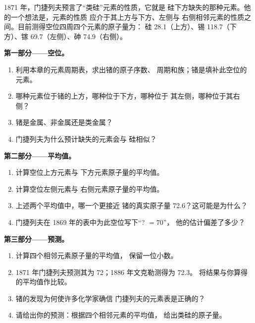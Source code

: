 \begin{problem}
\label{pb:g9:periodic-table-first-look:1}
1871 年，门捷列夫预言了“类硅”元素的性质，它就是
硅下方缺失的那种元素。他的一个想法是，元素的性质
应介于其上方与下方、左侧与
右侧相邻元素的性质之间。目前测得空位四周四个元素的原子量为：
硅 28.1（上方）、锡 118.7（下方）、镓 69.7（左侧）、砷
74.9（右侧）。

\medskip
\noindent\textbf{第一部分——空位。}
\begin{enumerate}
  \item 利用本章的元素周期表，求出锗的原子序数、
        周期和族；锗是填补此空位的
        元素。
  \item 哪种元素位于锗的上方，哪种位于下方，哪种位于
        其左侧，哪种位于其右侧？
  \item 锗是金属、非金属还是类金属？
  \item 门捷列夫为什么预计缺失的元素会与
        硅相似？
\end{enumerate}

\medskip
\noindent\textbf{第二部分——平均值。}
\begin{enumerate}[resume]
  \item 计算空位上方元素与
        下方元素原子量的平均值。
  \item 计算空位左侧元素与
        右侧元素原子量的平均值。
  \item 上述两个平均值中，哪一个更接近
        锗的真实原子量 72.6？这可能是为什么？
  \item 门捷列夫在 1869 年的表中为此空位写下“? $= 70$”，
        他的估计偏差了多少？
\end{enumerate}

\medskip
\noindent\textbf{第三部分——预测。}
\begin{enumerate}[resume]
  \item 计算四个相邻元素原子量的平均值，
        保留一位小数。
  \item 1871 年门捷列夫预测其为 72；1886 年文克勒测得为 72.3。
        将结果与你算得的平均值作比较。
  \item 锗的发现为何使许多化学家确信
        门捷列夫的元素表是正确的？
  \item 请给出你的预测：根据四个相邻元素的平均值，
        给出类硅的原子量。
\end{enumerate}
\end{problem}
